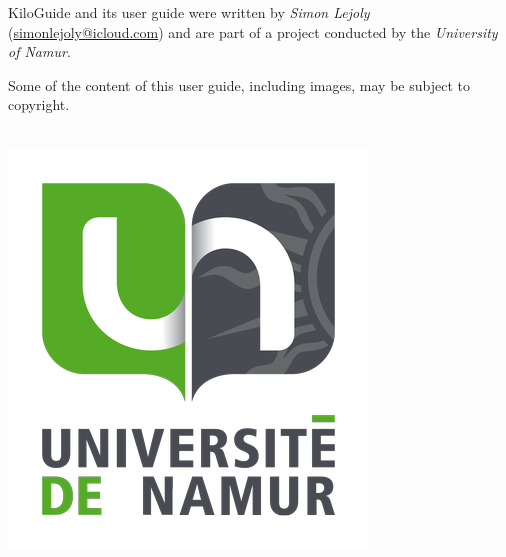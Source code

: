 \documentclass[a4paper,12pt,titlepage]{scrartcl}
\begin{document}
KiloGuide and its user guide were written by \emph{Simon Lejoly} (\href{mailto:simonlejoly@icloud.com}{simonlejoly@icloud.com}) and are part of a project conducted by the \emph{University of Namur}.

Some of the content of this user guide, including images, may be subject to copyright.\\\\

\begin{center}
\includegraphics[scale=0.3]{unamur.png}
\end{center}
\end{document}
